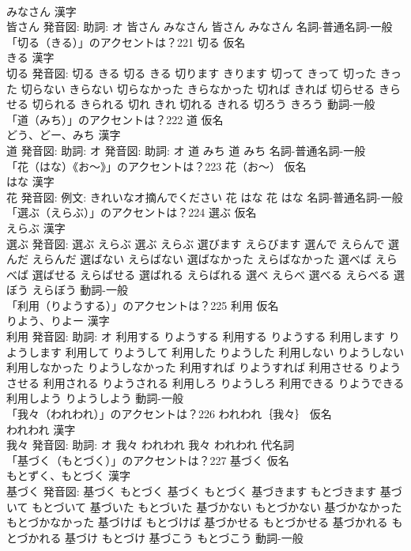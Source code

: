 \documentclass[8pt]{extreport}
\begin{document}
\begin{CJK}{UTF8}{min}
\\	みなさん 漢字　
\\	皆さん 発音図: 助詞: オ	皆さん みなさん		皆さん みなさん				名詞-普通名詞-一般 
\\	「切る（きる）」のアクセントは？221	切る 仮名　
\\	きる 漢字　
\\	切る 発音図:	切る きる		切る きる 切ります きります 切って きって 切った きった 切らない きらない 切らなかった きらなかった 切れば きれば 切らせる きらせる 切られる きられる 切れ きれ 切れる きれる 切ろう きろう				動詞-一般 
\\	「道（みち）」のアクセントは？222	道 仮名　
\\	どう、どー、みち 漢字　
\\	道 発音図: 助詞: オ 発音図: 助詞: オ	道 みち		道 みち				名詞-普通名詞-一般 
\\	「花（はな）《お〜》」のアクセントは？223	花（お〜） 仮名　
\\	はな 漢字　
\\	花 発音図: 例文: きれいなオ摘んでください	花 はな		花 はな				名詞-普通名詞-一般 
\\	「選ぶ（えらぶ）」のアクセントは？224	選ぶ 仮名　
\\	えらぶ 漢字　
\\	選ぶ 発音図:	選ぶ えらぶ		選ぶ えらぶ 選びます えらびます 選んで えらんで 選んだ えらんだ 選ばない えらばない 選ばなかった えらばなかった 選べば えらべば 選ばせる えらばせる 選ばれる えらばれる 選べ えらべ 選べる えらべる 選ぼう えらぼう				動詞-一般 
\\	「利用（りようする）」のアクセントは？225	利用 仮名　
\\	りよう、りよー 漢字　
\\	利用 発音図: 助詞: オ	利用する りようする		利用する りようする 利用します りようします 利用して りようして 利用した りようした 利用しない りようしない 利用しなかった りようしなかった 利用すれば りようすれば 利用させる りようさせる 利用される りようされる 利用しろ りようしろ 利用できる りようできる 利用しよう りようしよう				動詞-一般 
\\	「我々（われわれ）」のアクセントは？226	われわれ｛我々｝ 仮名　
\\	われわれ 漢字　
\\	我々 発音図: 助詞: オ	我々 われわれ		我々 われわれ				代名詞 
\\	「基づく（もとづく）」のアクセントは？227	基づく 仮名　
\\	もとずく、もとづく 漢字　
\\	基づく 発音図:	基づく もとづく		基づく もとづく 基づきます もとづきます 基づいて もとづいて 基づいた もとづいた 基づかない もとづかない 基づかなかった もとづかなかった 基づけば もとづけば 基づかせる もとづかせる 基づかれる もとづかれる 基づけ もとづけ 基づこう もとづこう				動詞-一般 

\end{CJK}
\end{document}
